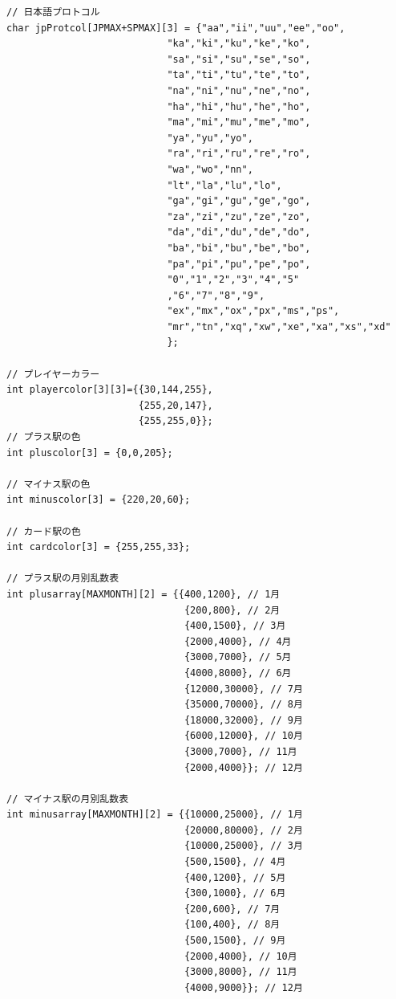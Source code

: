 \documentclass[a4j]{jarticle}
\begin{document}
\begin{lstlisting}[basicstyle=\ttfamily\footnotesize, frame=single,label=code2,caption=game.c]
// 日本語プロトコル
char jpProtcol[JPMAX+SPMAX][3] = {"aa","ii","uu","ee","oo",
                            "ka","ki","ku","ke","ko",
                            "sa","si","su","se","so",
                            "ta","ti","tu","te","to",
                            "na","ni","nu","ne","no",
                            "ha","hi","hu","he","ho",
                            "ma","mi","mu","me","mo",
                            "ya","yu","yo",
                            "ra","ri","ru","re","ro",
                            "wa","wo","nn",
                            "lt","la","lu","lo",
                            "ga","gi","gu","ge","go",
                            "za","zi","zu","ze","zo",
                            "da","di","du","de","do",
                            "ba","bi","bu","be","bo",
                            "pa","pi","pu","pe","po",
                            "0","1","2","3","4","5"
                            ,"6","7","8","9",
                            "ex","mx","ox","px","ms","ps",
                            "mr","tn","xq","xw","xe","xa","xs","xd"
                            };

// プレイヤーカラー
int playercolor[3][3]={{30,144,255},
                       {255,20,147},
                       {255,255,0}};
// プラス駅の色
int pluscolor[3] = {0,0,205};

// マイナス駅の色
int minuscolor[3] = {220,20,60};

// カード駅の色
int cardcolor[3] = {255,255,33};

// プラス駅の月別乱数表
int plusarray[MAXMONTH][2] = {{400,1200}, // 1月
                               {200,800}, // 2月
                               {400,1500}, // 3月
                               {2000,4000}, // 4月
                               {3000,7000}, // 5月
                               {4000,8000}, // 6月
                               {12000,30000}, // 7月
                               {35000,70000}, // 8月
                               {18000,32000}, // 9月
                               {6000,12000}, // 10月
                               {3000,7000}, // 11月
                               {2000,4000}}; // 12月

// マイナス駅の月別乱数表
int minusarray[MAXMONTH][2] = {{10000,25000}, // 1月
                               {20000,80000}, // 2月
                               {10000,25000}, // 3月
                               {500,1500}, // 4月
                               {400,1200}, // 5月
                               {300,1000}, // 6月
                               {200,600}, // 7月
                               {100,400}, // 8月
                               {500,1500}, // 9月
                               {2000,4000}, // 10月
                               {3000,8000}, // 11月
                               {4000,9000}}; // 12月


\end{lstlisting}
\end{document}
